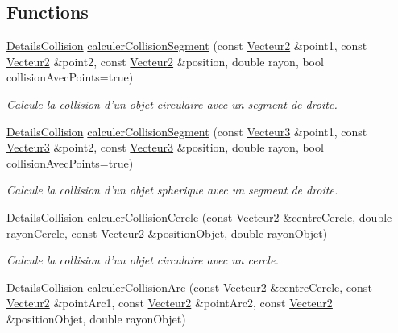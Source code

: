 \subsection*{Functions}
\begin{DoxyCompactItemize}
\item 
\hyperlink{classaidecollision_1_1_details_collision}{Details\-Collision} \hyperlink{namespaceaidecollision_a76a6a46bdde378dd6781ae23c1bfa313}{calculer\-Collision\-Segment} (const \hyperlink{group__utilitaire_ga6f7808e68c967b90bd7e737b7e1b78de}{Vecteur2} \&point1, const \hyperlink{group__utilitaire_ga6f7808e68c967b90bd7e737b7e1b78de}{Vecteur2} \&point2, const \hyperlink{group__utilitaire_ga6f7808e68c967b90bd7e737b7e1b78de}{Vecteur2} \&position, double rayon, bool collision\-Avec\-Points=true)
\begin{DoxyCompactList}\small\item\em Calcule la collision d'un objet circulaire avec un segment de droite. \end{DoxyCompactList}\item 
\hyperlink{classaidecollision_1_1_details_collision}{Details\-Collision} \hyperlink{namespaceaidecollision_aa891c68d5b7e4fa059cfa0cca600cc52}{calculer\-Collision\-Segment} (const \hyperlink{group__utilitaire_ga541aa4837ad9250d3a248dc82ee9ad4d}{Vecteur3} \&point1, const \hyperlink{group__utilitaire_ga541aa4837ad9250d3a248dc82ee9ad4d}{Vecteur3} \&point2, const \hyperlink{group__utilitaire_ga541aa4837ad9250d3a248dc82ee9ad4d}{Vecteur3} \&position, double rayon, bool collision\-Avec\-Points=true)
\begin{DoxyCompactList}\small\item\em Calcule la collision d'un objet spherique avec un segment de droite. \end{DoxyCompactList}\item 
\hyperlink{classaidecollision_1_1_details_collision}{Details\-Collision} \hyperlink{namespaceaidecollision_aa7ef6624305b37a13f5c583bbbc41882}{calculer\-Collision\-Cercle} (const \hyperlink{group__utilitaire_ga6f7808e68c967b90bd7e737b7e1b78de}{Vecteur2} \&centre\-Cercle, double rayon\-Cercle, const \hyperlink{group__utilitaire_ga6f7808e68c967b90bd7e737b7e1b78de}{Vecteur2} \&position\-Objet, double rayon\-Objet)
\begin{DoxyCompactList}\small\item\em Calcule la collision d'un objet circulaire avec un cercle. \end{DoxyCompactList}\item 
\hyperlink{classaidecollision_1_1_details_collision}{Details\-Collision} \hyperlink{namespaceaidecollision_abd98f8eab0ec2b1370fecaf55b9dcf55}{calculer\-Collision\-Arc} (const \hyperlink{group__utilitaire_ga6f7808e68c967b90bd7e737b7e1b78de}{Vecteur2} \&centre\-Cercle, const \hyperlink{group__utilitaire_ga6f7808e68c967b90bd7e737b7e1b78de}{Vecteur2} \&point\-Arc1, const \hyperlink{group__utilitaire_ga6f7808e68c967b90bd7e737b7e1b78de}{Vecteur2} \&point\-Arc2, const \hyperlink{group__utilitaire_ga6f7808e68c967b90bd7e737b7e1b78de}{Vecteur2} \&position\-Objet, double rayon\-Objet)

\end{DoxyCompactItemize}
